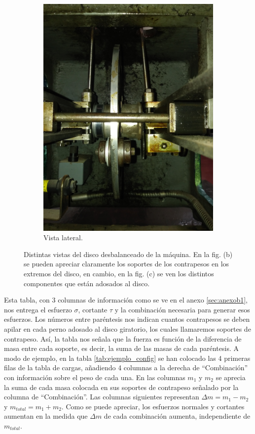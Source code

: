 \begin{figure}[h]
\begin{subfigure}{0.32\linewidth}
		\includegraphics[angle=270, origin=c, width=\linewidth]{Imagenes/disco_lateral.jpg}
		\caption{Vista lateral.}\label{fig:disco_lat}
	\end{subfigure}%
\caption{Distintas vistas del disco desbalanceado de la máquina. En la fig. (b) se pueden apreciar claramente los soportes de los contrapesos en los extremos del disco, en cambio, en la fig. (c) se ven los distintos componentes que están adosados al disco.}
\label{fig:disco_completo}
\end{figure}

Esta tabla, con 3 columnas de información como se ve en el anexo \ref{sec:anexob1}, nos entrega el esfuerzo $\sigma$, cortante $\tau$ y la combinación necesaria para generar esos esfuerzos. Los números entre paréntesis nos indican cuantos contrapesos se deben apilar en cada perno adosado al disco giratorio, los cuales llamaremos soportes de contrapeso. Así, la tabla nos señala que la fuerza es función de la diferencia de masa entre cada soporte, es decir, la suma de las masas de cada paréntesis. A modo de ejemplo, en la tabla \ref{tab:ejemplo_config} se han colocado las 4 primeras filas de la tabla de cargas, añadiendo 4 columnas a la derecha de ``Combinación'' con información sobre el peso de cada una. En las columnas $m_1$ y $m_2$ se aprecia la suma de cada masa colocada en sus soportes de contrapeso señalado por la columna de ``Combinación''. Las columnas siguientes representan $\Delta m = m_1-m_2$ y $m_{total}=m_1+m_2$. Como se puede apreciar, los esfuerzos normales y cortantes aumentan en la medida que $\Delta m$ de cada combinación aumenta, independiente de $m_{total}$.

